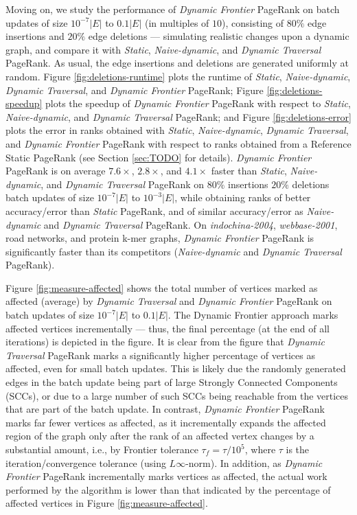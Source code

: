 Moving on, we study the performance of \textit{Dynamic Frontier} PageRank on batch updates of size $10^{-7}|E|$ to $0.1|E|$ (in multiples of $10$), consisting of $80\%$ edge insertions and $20\%$ edge deletions --- simulating realistic changes upon a dynamic graph, and compare it with \textit{Static}, \textit{Naive-dynamic}, and \textit{Dynamic Traversal} PageRank. As usual, the edge insertions and deletions are generated uniformly at random. Figure \ref{fig:deletions-runtime} plots the runtime of \textit{Static}, \textit{Naive-dynamic}, \textit{Dynamic Traversal}, and \textit{Dynamic Frontier} PageRank; Figure \ref{fig:deletions-speedup} plots the speedup of \textit{Dynamic Frontier} PageRank with respect to \textit{Static}, \textit{Naive-dynamic}, and \textit{Dynamic Traversal} PageRank; and Figure \ref{fig:deletions-error} plots the error in ranks obtained with \textit{Static}, \textit{Naive-dynamic}, \textit{Dynamic Traversal}, and \textit{Dynamic Frontier} PageRank with respect to ranks obtained from a Reference Static PageRank (see Section \ref{sec:TODO} for details). \textit{Dynamic Frontier} PageRank is on average $7.6\times$, $2.8\times$, and $4.1\times$ faster than \textit{Static}, \textit{Naive-dynamic}, and \textit{Dynamic Traversal} PageRank on $80\%$ insertions $20\%$ deletions batch updates of size $10^{-7}|E|$ to $10^{-3}|E|$, while obtaining ranks of better accuracy/error than \textit{Static} PageRank, and of similar accuracy/error as \textit{Naive-dynamic} and \textit{Dynamic Traversal} PageRank. On \textit{indochina-2004}, \textit{webbase-2001}, road networks, and protein k-mer graphs, \textit{Dynamic Frontier} PageRank is significantly faster than its competitors (\textit{Naive-dynamic} and \textit{Dynamic Traversal} PageRank).

Figure \ref{fig:measure-affected} shows the total number of vertices marked as affected (average) by \textit{Dynamic Traversal} and \textit{Dynamic Frontier} PageRank on batch updates of size $10^{-7}|E|$ to $0.1|E|$. The Dynamic Frontier approach marks affected vertices incrementally --- thus, the final percentage (at the end of all iterations) is depicted in the figure. It is clear from the figure that \textit{Dynamic Traversal} PageRank marks a significantly higher percentage of vertices as affected, even for small batch updates. This is likely due the randomly generated edges in the batch update being part of large Strongly Connected Components (SCCs), or due to a large number of such SCCs being reachable from the vertices that are part of the batch update. In contrast, \textit{Dynamic Frontier} PageRank marks far fewer vertices as affected, as it incrementally expands the affected region of the graph only after the rank of an affected vertex changes by a substantial amount, i.e., by Frontier tolerance $\tau_f = \tau / 10^5$, where $\tau$ is the iteration/convergence tolerance (using $L\infty$-norm). In addition, as \textit{Dynamic Frontier} PageRank incrementally marks vertices as affected, the actual work performed by the algorithm is lower than that indicated by the percentage of affected vertices in Figure \ref{fig:measure-affected}.

